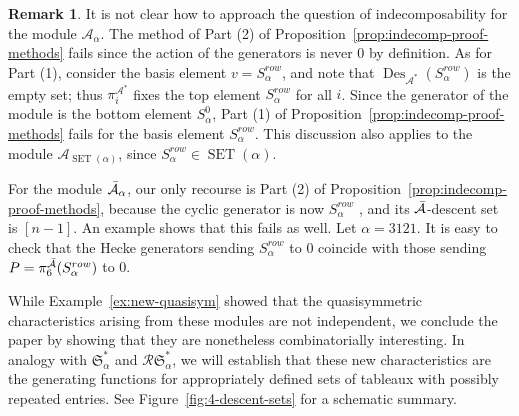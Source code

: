 \documentclass[12pt,letterpaper]{amsart}
\theoremstyle{definition}
\newtheorem{remark}[theorem]{Remark}
\newcommand{\dI}{\mathfrak{S}^*}
\newcommand{\rdI}{\mathcal{R}\mathfrak{S}^*}
\DeclareMathOperator{\Des}{Des}
\newcommand{\SET}{\ensuremath{\operatorname{SET}}} \newcommand{\NSET}{\ensuremath{\operatorname{NSET}}}\newcommand{\SRCT}{\ensuremath{\operatorname{SRCT}}}
\begin{document}
\begin{remark}\label{rem:indecomp?}
It is not clear how to approach the question of indecomposability for the module $\mathcal{A}_\alpha$.  The method of Part (2) of Proposition~\ref{prop:indecomp-proof-methods} fails since the action of the generators is never 0 by definition.  As for Part (1), consider the  basis element $v=S^{row}_\alpha$, and note that $\Des_{\mathcal{A}^*}(S^{row}_\alpha)$ is the empty set; thus  $\pi_i^{\mathcal{A}^*}$ fixes 
the top element $S^{row}_\alpha$ for all $i$. Since the generator of the module is the bottom element $S^{0}_\alpha$, Part (1) of Proposition~\ref{prop:indecomp-proof-methods} fails for the basis element $S^{row}_\alpha$.  This discussion also applies to the module $\mathcal{A}_{\SET(\alpha)}$, since $S^{row}_\alpha\in \SET(\alpha)$. 

For the module $\operatorname{\bar{\mathcal{A}}}_\alpha$,  our only recourse is Part (2) of Proposition~\ref{prop:indecomp-proof-methods}, because the cyclic generator is now $S^{row}_\alpha$ , and its $\operatorname{\bar{\mathcal{A}}}$-descent set is $[n-1]$.  An example shows that this fails as well. Let $\alpha=3121$.  It is easy to check that the Hecke generators sending $S^{row}_\alpha$ to 0 coincide with those sending $P=\pi_6^{\operatorname{\bar{\mathcal{A}}}}(S^{row}_\alpha)$ to 0.  
\end{remark}
While Example~\ref{ex:new-quasisym} showed that the quasisymmetric characteristics arising from these modules are not independent, we conclude the paper by showing that they are nonetheless  combinatorially  interesting.  
In analogy with $\dI_\alpha$ and $\rdI_\alpha$, we will establish that these new characteristics are the generating functions for appropriately defined sets of  tableaux with possibly repeated entries.  See Figure~\ref{fig:4-descent-sets} for a schematic summary.
\end{document}
